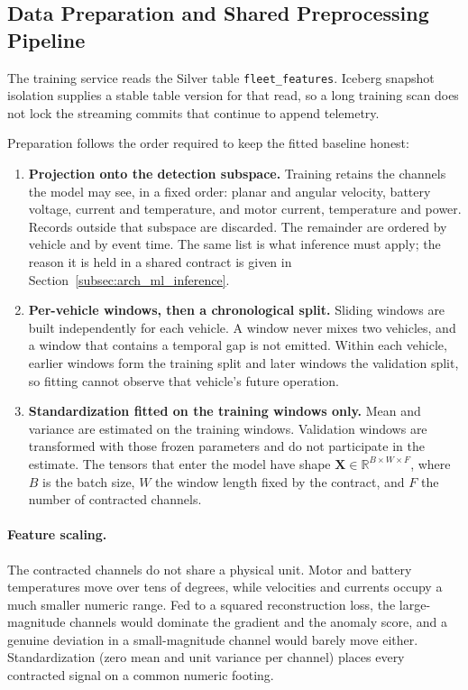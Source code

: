 \subsection{Data Preparation and Shared Preprocessing Pipeline}
\label{subsec:arch_ml_prep}

The training service reads the Silver table \texttt{fleet\_features}. Iceberg snapshot isolation supplies a stable table version for that read, so a long training scan does not lock the streaming commits that continue to append telemetry.

Preparation follows the order required to keep the fitted baseline honest:
\begin{enumerate}
    \item \textbf{Projection onto the detection subspace.} Training retains the channels the model may see, in a fixed order: planar and angular velocity, battery voltage, current and temperature, and motor current, temperature and power. Records outside that subspace are discarded. The remainder are ordered by vehicle and by event time. The same list is what inference must apply; the reason it is held in a shared contract is given in Section~\ref{subsec:arch_ml_inference}.
    \item \textbf{Per-vehicle windows, then a chronological split.} Sliding windows are built independently for each vehicle. A window never mixes two vehicles, and a window that contains a temporal gap is not emitted. Within each vehicle, earlier windows form the training split and later windows the validation split, so fitting cannot observe that vehicle's future operation.
    \item \textbf{Standardization fitted on the training windows only.} Mean and variance are estimated on the training windows. Validation windows are transformed with those frozen parameters and do not participate in the estimate. The tensors that enter the model have shape $\mathbf{X} \in \mathbb{R}^{B \times W \times F}$, where $B$ is the batch size, $W$ the window length fixed by the contract, and $F$ the number of contracted channels.
\end{enumerate}

\paragraph{Feature scaling.}
The contracted channels do not share a physical unit. Motor and battery temperatures move over tens of degrees, while velocities and currents occupy a much smaller numeric range. Fed to a squared reconstruction loss, the large-magnitude channels would dominate the gradient and the anomaly score, and a genuine deviation in a small-magnitude channel would barely move either. Standardization (zero mean and unit variance per channel) places every contracted signal on a common numeric footing.

